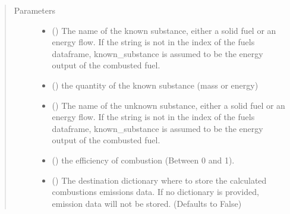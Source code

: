 \documentclass[a4paper,10pt,english]{sphinxmanual}
\begin{document}
\begin{fulllineitems}
\begin{sphinxVerbatim}[commandchars=\\\{\}]
   
\end{sphinxVerbatim}
\begin{quote}\begin{description}
\item[{Parameters}] \leavevmode\begin{itemize}
\item {} 
 () \textendash{} The name of the known substance, either a solid
fuel or an energy flow. If the string is not in the index of the
fuels dataframe, known\_substance is assumed to be the energy
output of the combusted fuel.

\item {} 
 () \textendash{} the quantity of the known substance (mass or energy)

\item {} 
 () \textendash{} The name of the unknown substance, either a
solid fuel or an energy flow. If the string is not in the index of
the fuels dataframe, known\_substance is assumed to be the energy
output of the combusted fuel.

\item {} 
 () \textendash{} the efficiency of combustion (Between 0 and 1).

\item {} 
 () \textendash{} The destination dictionary where to
store the calculated combustions emissions data. If no dictionary
is provided, emission data will not be stored.
(Defaults to False)


\end{itemize}
\end{description}
\end{quote}
\end{fulllineitems}
\end{document}

